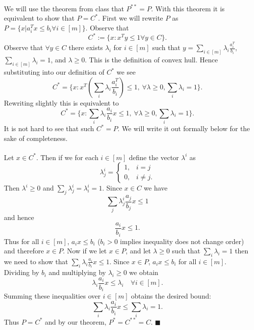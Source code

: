 \documentclass[letterpaper,12pt,oneside,onecolumn]{article}
\begin{document}
\paragraph{}
We will use the theorem from class that $P^{**} = P$. With this theorem it is equivalent to show that $P = C^*$. First we will rewrite $P$ as $P = \{x| a_i^Tx \leq b_i \forall i\in[m]\}$. Observe that 
$$C^* := \{ x: x^Ty \leq 1\forall y \in C\}.$$
Observe that $\forall y \in C$ there exists $\lambda_i$ for $i\in [m]$ such that $y = \sum_{i\in[m]} \lambda_i \frac{a_i^T}{b_i}$, $\sum_{i\in [m]}\lambda_i = 1$, and $\lambda \geq 0$. This is the definition of convex hull. Hence substituting into our definition of $C^*$ we see
$$C^* = \{x : x^T(\sum_{i} \lambda_i \frac{a_i^T}{b_i}) \leq 1,\ \forall \lambda \geq 0, \sum_i \lambda_i = 1\}.$$
Rewriting slightly this is equivalent to
$$C^* = \{x : \sum_{i}\lambda_i \frac{a_i}{b_i}x \leq 1,\ \forall \lambda \geq 0, \sum_i\lambda_i = 1\}.$$
It is not hard to see that such $C^* = P$. We will write it out formally below for the sake of completeness.
\paragraph{}
Let $x\in C^*$. Then if we for each $i \in [m]$ define the vector $\lambda^i$ as
$$\lambda^i_j = \begin{cases}
1, &i=j \\
0, &i\neq j.
\end{cases}$$
Then $\lambda^i \geq 0$ and $\sum_j \lambda^i_j = \lambda^i_i = 1$. Since $x \in C$ we have
$$\sum_{j}\lambda^i_j \frac{a_j}{b_j} x \leq 1$$
and hence
$$\frac{a_i}{b_i} x \leq 1.$$
Thus for all $i \in [m]$, $a_i x\leq b_i$ ($b_i > 0$ implies inequality does not change order) and therefore $x \in P$. Now if we let $x\in P$, and let $\lambda \geq 0$ such that $\sum_i \lambda_i = 1$ then we need to show that $\sum_i \lambda_i \frac{a_i}{b_i} x \leq 1$. Since $x \in P$, $a_i x \leq b_i$ for all $i \in [m]$. Dividing by $b_i$ and multiplying by $\lambda_i \geq 0$ we obtain
$$\lambda_i\frac{a_i}{b_i} x \leq \lambda_i \quad \forall i \in [m].$$
Summing these inequalities over $i\in[m]$ obtains the desired bound:
$$\sum_i \lambda_i \frac{a_i}{b_i}x \leq \sum_i \lambda_i = 1.$$
Thus $P= C^*$ and by our theorem, $P^* = C^{**} = C$. $\blacksquare$
\end{document}
